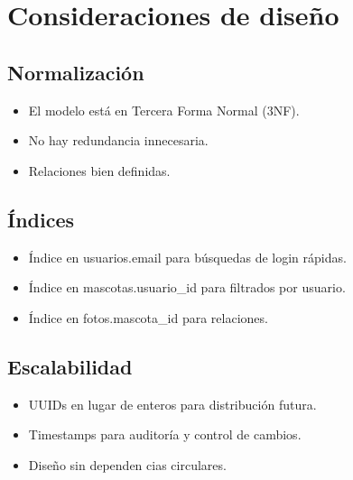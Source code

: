 \documentclass[12pt,a4paper]{article}
\begin{document}
\section{Consideraciones de dise\~no}

\subsection{Normalizaci\'on}
\begin{itemize}[leftmargin=*]
    \item El modelo est\'a en Tercera Forma Normal (3NF).
    \item No hay redundancia innecesaria.
    \item Relaciones bien definidas.
\end{itemize}

\subsection{\'Indices}
\begin{itemize}[leftmargin=*]
    \item \'Indice en usuarios.email para b\'usquedas de login r\'apidas.
    \item \'Indice en mascotas.usuario\_id para filtrados por usuario.
    \item \'Indice en fotos.mascota\_id para relaciones.
\end{itemize}

\subsection{Escalabilidad}
\begin{itemize}[leftmargin=*]
    \item UUIDs en lugar de enteros para distribuci\'on futura.
    \item Timestamps para auditor\'ia y control de cambios.
    \item Dise\~no sin dependen cias circulares.
\end{itemize}
\end{document}

